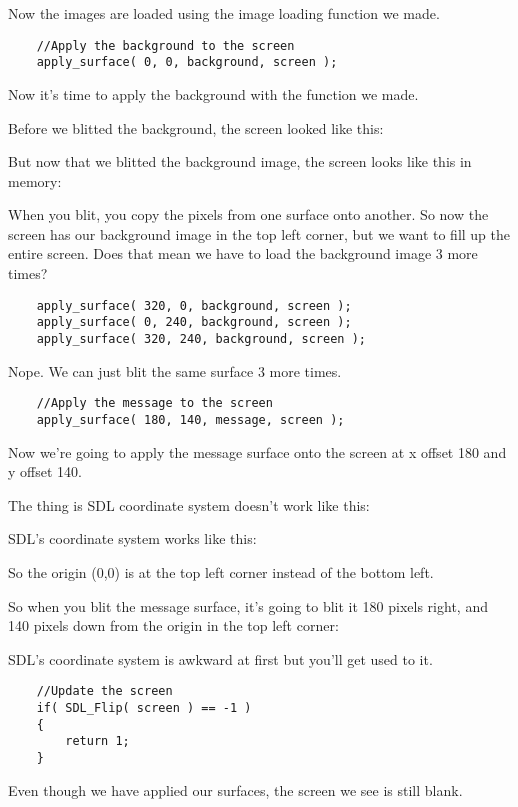 Now the images are loaded using the image loading function we made.

\begin{verbatim}
    //Apply the background to the screen
    apply_surface( 0, 0, background, screen );
\end{verbatim}

Now it's time to apply the background with the function we made.

Before we blitted the background, the screen looked like this:

But now that we blitted the background image, the screen looks like this in
memory:

When you blit, you copy the pixels from one surface onto another. So now the
screen has our background image in the top left corner, but we want to fill up
the entire screen. Does that mean we have to load the background image 3 more
times?

\begin{verbatim}
    apply_surface( 320, 0, background, screen );
    apply_surface( 0, 240, background, screen );
    apply_surface( 320, 240, background, screen );
\end{verbatim}

Nope. We can just blit the same surface 3 more times.

\begin{verbatim}
    //Apply the message to the screen
    apply_surface( 180, 140, message, screen );
\end{verbatim}

Now we're going to apply the message surface onto the screen at x offset 180 and
y offset 140.

The thing is SDL coordinate system doesn't work like this:

SDL's coordinate system works like this:

So the origin (0,0) is at the top left corner instead of the bottom left.

So when you blit the message surface, it's going to blit it 180 pixels right,
and 140 pixels down from the origin in the top left corner:

SDL's coordinate system is awkward at first but you'll get used to it.

\begin{verbatim}
    //Update the screen
    if( SDL_Flip( screen ) == -1 )
    {
        return 1;
    }
\end{verbatim}

Even though we have applied our surfaces, the screen we see is still blank.

